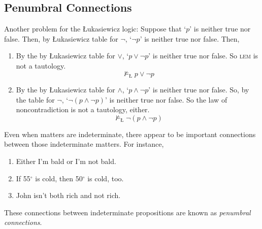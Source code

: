 \documentclass[landscape, two column, full page,reqno]{article}
\newcommand{\qe}{\begin{enumerate}[align=left,style=nextline,leftmargin=17pt,labelsep=5pt,font=\normalfont]}
\newcommand{\e}{\emph}
\newcommand{\ze}{\end{enumerate}}
\newcommand{\p}{\item}
\newcommand{\s}{\textsc}
\begin{document}
\subsection{Penumbral Connections}
\p Another problem for the \L ukasiewicz logic:  Suppose that `$p$' is neither true nor false.  Then, by \L ukasiewicz table for $\neg$, `$\neg p$' is neither true nor false.  Then,
	\qe
	\p By the by \L ukasiewicz table for $\vee$, `$p \vee \neg p$' is neither true nor false.  So \s{lem} is not a tautology.
							\[
							\not\models_{\text{\L}} p \vee \neg p
							\]
	\p By the by \L ukasiewicz table for $\wedge$, `$p \wedge \neg p$' is neither true nor false.  So, by the table for $\neg$, `$\neg(p \wedge \neg p)$' is neither true nor false.  So the law of noncontradiction is not a tautology, either.
							\[
							\not\models_{\text{\L}} \neg (p \wedge \neg p)
							\]
	\ze 
\p Even when matters are indeterminate, there appear to be important connections between those  indeterminate matters.  For instance,
	\qe
	\p Either I'm bald or I'm not bald.
	\p If 55$^\circ$ is cold, then 50$^\circ$ is cold, too.
	\p John isn't both rich and not rich.
	\ze 
These connections between indeterminate propositions are known as \e{penumbral connections}.
\end{document}
